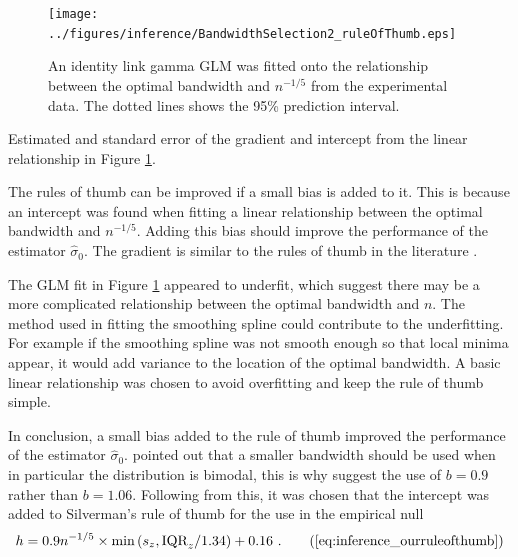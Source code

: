 \begin{figure}
  \centering
  \texttt{[image: ../figures/inference/BandwidthSelection2\_ruleOfThumb.eps]}
  \caption{An identity link gamma GLM was fitted onto the relationship between the optimal bandwidth and $n^{-1/5}$ from the experimental data. The dotted lines shows the 95\% prediction interval.}
  \label{fig:inference_BandwidthSelection2_ruleOfThumb}
\end{figure}

\begin{table}
  \centering
  
  \caption{Estimated and standard error of the gradient and intercept from the linear relationship in Figure \ref{fig:inference_BandwidthSelection2_ruleOfThumb}.}
  \label{table:inference_BandwidthSelection2_ruleOfThumb}
\end{table}

The rules of thumb can be improved if a small bias is added to it. This is because an intercept was found when fitting a linear relationship between the optimal bandwidth and $n^{-1/5}$. Adding this bias should improve the performance of the estimator $\widehat{\sigma}_0$. The gradient is similar to the rules of thumb in the literature \citep{sheather2004density}.

The GLM fit in Figure \ref{fig:inference_BandwidthSelection2_ruleOfThumb} appeared to underfit, which suggest there may be a more complicated relationship between the optimal bandwidth and $n$. The method used in fitting the smoothing spline could contribute to the underfitting. For example if the smoothing spline was not smooth enough so that local minima appear, it would add variance to the location of the optimal bandwidth. A basic linear relationship was chosen to avoid overfitting and keep the rule of thumb simple.

In conclusion, a small bias added to the rule of thumb improved the performance of the estimator $\widehat{\sigma}_0$. \cite{silverman1986density} pointed out that a smaller bandwidth should be used when in particular the distribution is bimodal, this is why \cite{silverman1986density} suggest the use of $b=0.9$ rather than $b=1.06$. Following from this, it was chosen that the intercept was added to Silverman's rule of thumb for the use in the empirical null
\begin{equation}
  h = 0.9n^{-1/5}\times\text{min}\left(s_z,\text{IQR}_z/1.34\right) + 0.16
  \ .
  \tag{\ref{eq:inference_ourruleofthumb}}
\end{equation}

